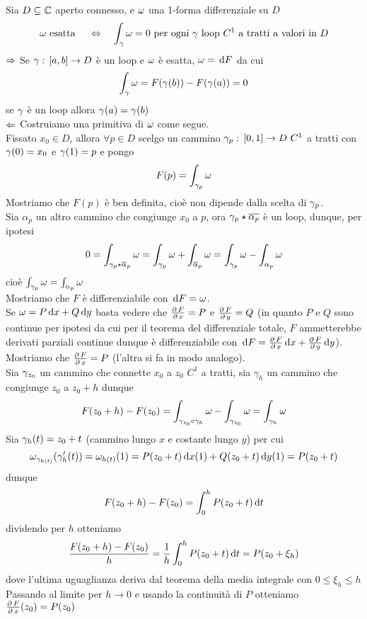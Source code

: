 \begin{thm} Sia $D\subseteq \mathbb{C}$ aperto connesso, e $\omega$ una 1-forma differenziale su $D$
$$\omega \text{ esatta } \quad \Leftrightarrow \quad \int_\gamma \omega = 0 \text{ per ogni } \gamma \text{ loop } C^1 \text{ a tratti a valori in } D$$
\proof $\Rightarrow$ Se $\gamma:\, [a,b]\to D$ \`e un loop e $\omega$ \`e esatta, $\omega=\, \mathrm{d} F$ da cui 
$$\int_\gamma \omega =F(\gamma(b))-F(\gamma(a)) = 0 $$
se $\gamma$ \`e un loop allora $\gamma(a) =\gamma(b)$\\
$\Leftarrow$ Costruiamo una primitiva di $\omega$ come segue.\\
Fissato $x_0\in D$, allora $\forall p \in D$ scelgo un cammino $\gamma_p:\,[0,1]\to D\, \, C^1$ a tratti con $\gamma(0)=x_0$ e $\gamma(1) =p$ e pongo $$F(p)=\int_{\gamma_p}\omega$$
Mostriamo che $F(p)$ \`e ben definita, cio\`e non dipende dalla scelta di $\gamma_p$.\\
Sia $\alpha_p$ un altro cammino che congiunge $x_0$ a $p$, ora $\gamma_p \star \overline{\alpha_p}$ \`e un loop, dunque,  per ipotesi 
$$0 = \int_{\gamma_p\star \overline{\alpha}_p}\omega = \int_{\gamma_p} \omega + \int_{\overline{\alpha}_p} \omega = \int_{\gamma_p} \omega -\int_{\alpha_p}\omega$$ 
cio\`e $\int_{\gamma_p} \omega = \int_{\alpha_p} \omega$\\
Mostriamo che $F$ \`e differenziabile con $\, \mathrm{d} F = \omega$.\\
Se $\omega=P\, \mathrm{d} x+ Q\, \mathrm{d} y$ basta vedere che $\frac{\partial \, F}{\partial\, x} = P $  e $\frac{\partial \, F}{\partial\, y} = Q$ (in quanto $P$ e $Q$ sono continue per ipotesi da cui per il teorema del differenziale totale, $F$ ammetterebbe derivati parziali continue dunque \`e differenziabile con $\, \mathrm{d} F = \frac{\partial \, F}{\partial\, x} \, \mathrm{d} x + \frac{\partial \, F}{\partial\, y} \, \mathrm{d} y$).\\
Mostriamo che $\frac{\partial \, F}{\partial\, x} = P $ (l'altra si fa in modo analogo).\\
Sia $\gamma_{z_0}$ un cammino che connette $x_0$ a $z_0\,\, C^1$ a tratti, sia $\gamma_h$ un cammino che congiunge $z_0$ a $z_0+h$ dunque
$$F(z_0+h)-F(z_0) =\int_{\gamma_{z_0}\circ \gamma_h} \omega - \int_{\gamma_{z_0}}\omega= \int_{\gamma_h}\omega$$
Sia $\gamma_h (t) = z_0+t$ (cammino lungo $x$ e costante lungo $y$) per cui 
$$\omega_{\gamma_{h(t)}}(\gamma'_h(t))=\omega_{h(t)}(1) = P(z_0+t)\, \mathrm{d} x (1) + Q(z_0+t)\, \mathrm{d} y (1)= P(z_0+t)$$
dunque 
$$F(z_0+h) - F(z_0) =\int_0^h P(z_0+t) \, \mathrm{d}t $$
dividendo per $h$ otteniamo 
$$\frac{F(z_0+h)-F(z_0)}{h}=\frac{1}{h}\int_{0}^h P(z_0+t)\, \mathrm{d}t = P(z_0+\xi_h)$$
dove l'ultima uguaglianza deriva dal teorema della media integrale con $0\leq \xi_h\leq h$\\
Passando al limite per $h\to 0$ e usando la continuit\`a di $P$ otteniamo 
$\frac{\partial \, F}{\partial\, x} (z_0) = P(z_0)$
\endproof

\end{thm}




















